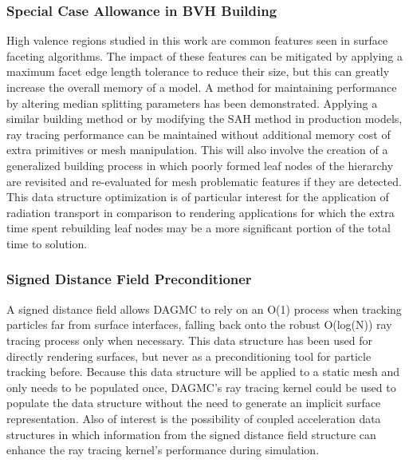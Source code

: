 \documentclass[12pt, a4paper]{article}
\begin{document}
\subsubsection{Special Case Allowance in BVH Building}

High valence regions studied in this work are common features seen in surface faceting algorithms. The impact of these features can be mitigated by applying a maximum facet edge length tolerance to reduce their size, but this can greatly increase the overall memory of a model. A method for maintaining performance by altering median splitting parameters has been demonstrated. Applying a similar building method or by modifying the SAH method in production models, ray tracing performance can be maintained without additional memory cost of extra primitives or mesh manipulation. This will also involve the creation of a generalized building process in which poorly formed leaf nodes of the hierarchy are revisited and re-evaluated for mesh problematic features if they are detected. This data structure optimization is of particular interest for the application of radiation transport in comparison to rendering applications for which the extra time spent rebuilding leaf nodes may be a more significant portion of the total time to solution.

\subsubsection{Signed Distance Field Preconditioner}

A signed distance field allows DAGMC to rely on an O(1) process when tracking particles far from surface interfaces, falling back onto the robust O(log(N)) ray tracing process only when necessary. This data structure has been used for directly rendering surfaces, but never as a preconditioning tool for particle tracking before. Because this data structure will be applied to a static mesh and only needs to be populated once, DAGMC's ray tracing kernel could be used to populate the data structure without the need to generate an implicit surface representation. Also of interest is the possibility of coupled acceleration data structures in which information from the signed distance field structure can enhance the ray tracing kernel's performance during simulation.


\end{document}
